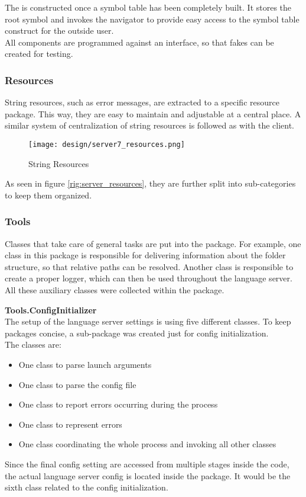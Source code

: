 The  is constructed once a symbol table has been completely built.
It stores the root symbol and invokes the navigator to provide easy access to the symbol table construct for the outside user.\\

All components are programmed against an interface, so that fakes can be created for testing.\\

\subsubsection{Resources}
String resources, such as error messages, are extracted to a specific resource package.
This way, they are easy to maintain and adjustable at a central place.
A similar system of centralization of string resources is followed as with the client.

\begin{figure}[h]
    \centering
    \texttt{[image: design/server7\_resources.png]}
    \caption{String Resources}
    \label{fig:server_resources}
\end{figure}

As seen in figure \ref{rig:server_resources}, they are further split into sub-categories to keep them organized.


\subsubsection{Tools}
Classes that take care of general tasks are put into the  package.
For example, one class in this package is responsible for delivering information about the folder structure, so that relative paths can be resolved.
Another class is responsible to create a proper logger, which can then be used throughout the language server.
All these auxiliary classes were collected within the  package.

\textbf{Tools.ConfigInitializer}\\

The setup of the language server settings is using five different classes.
To keep packages concise, a sub-package was created just for config initialization.\\
The classes are:
\begin{itemize}
    \item One class to parse launch arguments
    \item One class to parse the config file
    \item One class to report errors occurring during the process
    \item One class to represent errors
    \item One class coordinating the whole process and invoking all other classes
\end{itemize}
Since the final config setting are accessed from multiple stages inside the code, the actual language server config is located inside the  package.
It would be the sixth class related to the config initialization.

